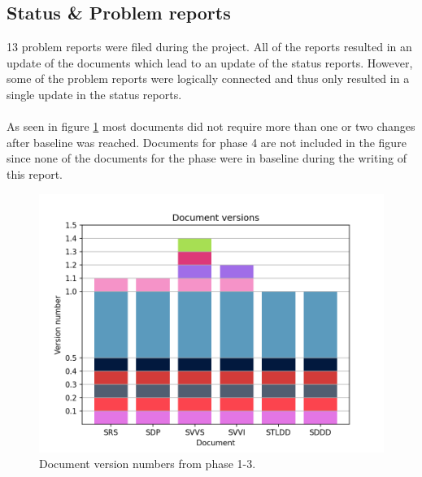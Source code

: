 \documentclass{article}
\begin{document}
    \subsection{Status \& Problem reports}
        13 problem reports were filed during the project. All of the reports
        resulted in an update of the documents which lead to an update of the status reports.
        However, some of the problem reports were logically connected and thus only resulted
        in a single update in the status reports.
        \\ \\
        As seen in figure \ref{fig:versions} most documents did not require more than one or two changes
        after baseline was reached. Documents for phase 4 are not included in the figure since none of the documents
        for the phase were in baseline during the writing of this report.
        
        \begin{figure}[!htb]
            \centering
              \includegraphics[width=\linewidth]{images/document_versions.png}
              \caption{Document version numbers from phase 1-3.}\label{fig:versions}
            \endminipage\hfill
        \end{figure}
        
\end{document}

